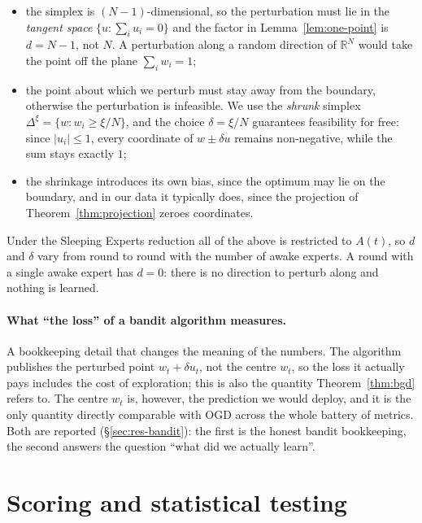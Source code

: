 \documentclass[12pt,a4paper,oneside]{report}
\renewcommand{\_}{\oldunderscore\allowbreak}
\theoremstyle{definition}
\theoremstyle{plain}
\theoremstyle{remark}
\begin{document}
\begin{itemize}
  \item the simplex is $(N\!-\!1)$-dimensional, so the perturbation must lie in the
        \emph{tangent space} $\{u : \sum_i u_i = 0\}$ and the factor in
        Lemma~\ref{lem:one-point} is $d = N-1$, not $N$. A perturbation along a random direction
        of $\mathbb{R}^N$ would take the point off the plane $\sum_i w_i = 1$;
  \item the point about which we perturb must stay away from the boundary, otherwise the
        perturbation is infeasible. We use the \emph{shrunk} simplex
        $\Delta^{\xi} = \{w : w_i \geq \xi/N\}$, and the choice $\delta = \xi/N$ guarantees
        feasibility for free: since $|u_i|\leq 1$, every coordinate of $w \pm \delta u$ remains
        non-negative, while the sum stays exactly $1$;
  \item the shrinkage introduces its own bias, since the optimum may lie on the boundary,
        and in our data it typically does, since the projection of
        Theorem~\ref{thm:projection} zeroes coordinates.
\end{itemize}

Under the Sleeping Experts reduction all of the above is restricted to $A(t)$, so $d$ and
$\delta$ vary from round to round with the number of awake experts. A round with a single awake
expert has $d=0$: there is no direction to perturb along and nothing is learned.

\paragraph{What ``the loss'' of a bandit algorithm measures.} A bookkeeping detail that changes
the meaning of the numbers. The algorithm publishes the perturbed point $w_t + \delta u_t$, not
the centre $w_t$, so the loss it actually pays includes the cost of exploration; this is also the
quantity Theorem~\ref{thm:bgd} refers to. The centre $w_t$ is, however, the prediction we would
deploy, and it is the only quantity directly comparable with OGD across the whole battery of
metrics. Both are reported (\S\ref{sec:res-bandit}): the first is the honest bandit bookkeeping,
the second answers the question ``what did we actually learn''.

\section{Scoring and statistical testing}
\end{document}
